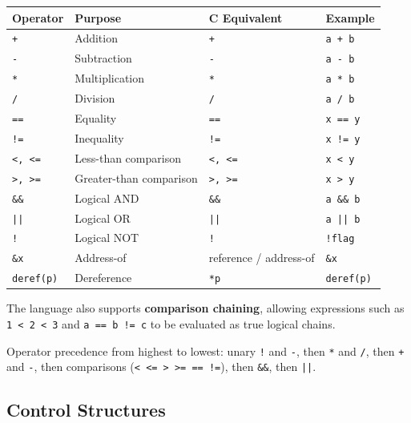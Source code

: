 \documentclass[12pt,a4paper]{article}
\begin{document}
\begin{table}[H]
\centering
\begin{tabularx}{\textwidth}{l X >{\raggedright\arraybackslash}X >{\raggedright\arraybackslash}X}
\toprule
\textnormal{Operator} & \textnormal{Purpose} & \textnormal{C Equivalent} & \textnormal{Example} \\
\midrule
\texttt{+} & Addition & \texttt{+} & \texttt{a + b} \\
\texttt{-} & Subtraction & \texttt{-} & \texttt{a - b} \\
\texttt{*} & Multiplication & \texttt{*} & \texttt{a * b} \\
\texttt{/} & Division & \texttt{/} & \texttt{a / b} \\
\texttt{==} & Equality & \texttt{==} & \texttt{x == y} \\
\texttt{!=} & Inequality & \texttt{!=} & \texttt{x != y} \\
\texttt{<, <=} & Less-than comparison & \texttt{<, <=} & \texttt{x < y} \\
\texttt{>, >=} & Greater-than comparison & \texttt{>, >=} & \texttt{x > y} \\
\texttt{\&\&} & Logical AND & \texttt{\&\&} & \texttt{a \&\& b} \\
\texttt{||} & Logical OR & \texttt{||} & \texttt{a || b} \\
\texttt{!} & Logical NOT & \texttt{!} & \texttt{!flag} \\
\texttt{\&x} & Address-of & reference / address-of & \texttt{\&x} \\
\texttt{deref(p)} & Dereference & \texttt{*p} & \texttt{deref(p)} \\
\bottomrule
\end{tabularx}
\end{table}

The language also supports \textbf{comparison chaining}, allowing expressions such as \texttt{1 < 2 < 3} and \texttt{a == b != c} to be evaluated as true logical chains.

Operator precedence from highest to lowest: unary \texttt{!} and \texttt{-}, then \texttt{*} and \texttt{/}, then \texttt{+} and \texttt{-}, then comparisons (\texttt{< <= > >= == !=}), then \texttt{\&\&}, then \texttt{||}.

\subsection*{Control Structures}
\end{document}
